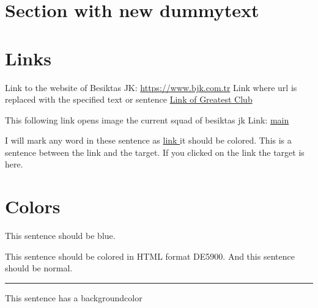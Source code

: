     \section{Section with new dummytext}
    \Blindtext[2][4]
    \pagebreak
    
    \section{Links}
    Link to the website of Besiktas JK: \url{https://www.bjk.com.tr}
    Link where url is replaced with the specified text or sentence 
    \href{http://www.bjk.com.tr}{Link of Greatest Club}

    This following link opens image the current squad of besiktas jk Link:
    \href{run:./main.pdf}{main}

    I will mark any word in these sentence as \hyperlink{example}{link } it should be colored.
    This is a sentence between the link and the target.
    If you clicked on the link the target is \hypertarget{example}{here}.
    \pagebreak
    \section{Colors}
    \pagecolor{black}
    \color{white}
    {   %
        \color{blue}
        This sentence should be blue.
        
    }
    {   
        \color[HTML]{DE5900}
        This sentence should be colored in HTML format DE5900. 
    }
    And this sentence should be normal.
    \\
    \noindent   %
    {
        \color{RubineRed}   
        \rule{\linewidth}{0.5mm}
    }
    {
        \colorbox{BurntOrange}{This sentence has a backgroundcolor}
    }

